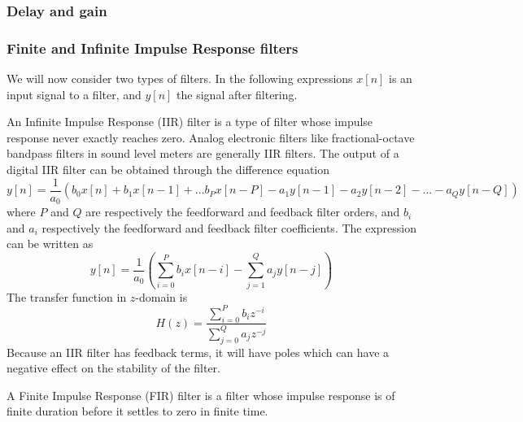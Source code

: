 
\subsubsection{Delay and gain}



\subsubsection{Finite and Infinite Impulse Response filters}
We will now consider two types of filters. In the following expressions $x[n]$ is an input signal to a filter, and $y[n]$ the signal after filtering.

An Infinite Impulse Response (IIR) filter is a type of filter whose impulse response never exactly reaches zero. Analog electronic filters like fractional-octave bandpass filters in sound level meters are generally IIR filters.
The output of a digital IIR filter can be obtained through the difference equation
\begin{equation}
 y[n] = \frac{1}{a_0} \left( b_0 x[n] + b_1 x[n-1] + \dots b_P x[n-P] - a_1 y[n-1] - a_2 y[n-2] - \dots - a_Q y[n-Q]\right)
\end{equation}
where $P$ and $Q$ are respectively the feedforward and feedback filter orders, and $b_i$ and $a_i$ respectively the feedforward and feedback filter coefficients.
The expression can be written as
\begin{equation}
 y[n] = \frac{1}{a_0} \left( \sum_{i=0}^{P} b_i x[n-i] - \sum_{j=1}^Q a_j y[n-j] \right)
\end{equation}
The transfer function in $z$-domain is
\begin{equation}
 H(z) = \frac{\sum_{i=0}^P b_i z^{-i}}{\sum_{j=0}^Q a_j z^{-j}}
\end{equation}
Because an IIR filter has feedback terms, it will have poles which can have a negative effect on the stability of the filter.

A Finite Impulse Response (FIR) filter is a filter whose impulse response is of finite duration before it settles to zero in finite time.

